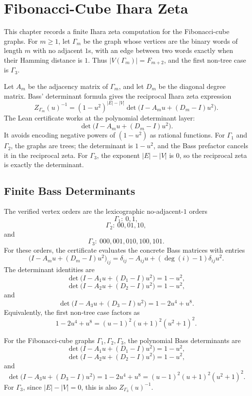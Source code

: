 \chapter{Fibonacci-Cube Ihara Zeta}
\label{ch:concrete-instances-fibonacci-cube-ihara-zeta}

This chapter records a finite Ihara zeta computation for the Fibonacci-cube graphs. For $m\ge 1$, let $\Gamma_m$ be the graph whose vertices are the binary words of length $m$ with no adjacent $1$s, with an edge between two words exactly when their Hamming distance is $1$. Thus $|V(\Gamma_m)|=F_{m+2}$, and the first non-tree case is $\Gamma_3$.

Let $A_m$ be the adjacency matrix of $\Gamma_m$, and let $D_m$ be the diagonal degree matrix. Bass' determinant formula gives the reciprocal Ihara zeta expression
$$
Z_{\Gamma_m}(u)^{-1}
=(1-u^2)^{|E|-|V|}
\det\!\bigl(I-A_mu+(D_m-I)u^2\bigr).
$$
The Lean certificate works at the polynomial determinant layer:
$$
\det\!\bigl(I-A_mu+(D_m-I)u^2\bigr).
$$
It avoids encoding negative powers of $(1-u^2)$ as rational functions. For $\Gamma_1$ and $\Gamma_2$, the graphs are trees; the determinant is $1-u^2$, and the Bass prefactor cancels it in the reciprocal zeta. For $\Gamma_3$, the exponent $|E|-|V|$ is $0$, so the reciprocal zeta is exactly the determinant.

\section{Finite Bass Determinants}
\label{sec:fibonacci-cube-ihara-finite-bass-determinants}

The verified vertex orders are the lexicographic no-adjacent-$1$ orders
$$
\Gamma_1:\ 0,1,
$$
$$
\Gamma_2:\ 00,01,10,
$$
and
$$
\Gamma_3:\ 000,001,010,100,101.
$$
For these orders, the certificate evaluates the concrete Bass matrices with entries
$$
\bigl(I-A_mu+(D_m-I)u^2\bigr)_{ij}
=\delta_{ij}-A_{ij}u+(\deg(i)-1)\delta_{ij}u^2.
$$
The determinant identities are
$$
\det\!\bigl(I-A_1u+(D_1-I)u^2\bigr)=1-u^2,
$$
$$
\det\!\bigl(I-A_2u+(D_2-I)u^2\bigr)=1-u^2,
$$
and
$$
\det\!\bigl(I-A_3u+(D_3-I)u^2\bigr)=1-2u^4+u^8.
$$
Equivalently, the first non-tree case factors as
$$
1-2u^4+u^8=(u-1)^2(u+1)^2(u^2+1)^2.
$$

\begin{theorem}
\label{thm:fibonacci-cube-ihara-zeta-certificate}
For the Fibonacci-cube graphs $\Gamma_1,\Gamma_2,\Gamma_3$, the polynomial Bass determinants are
$$
\det\!\bigl(I-A_1u+(D_1-I)u^2\bigr)=1-u^2,
$$
$$
\det\!\bigl(I-A_2u+(D_2-I)u^2\bigr)=1-u^2,
$$
and
$$
\det\!\bigl(I-A_3u+(D_3-I)u^2\bigr)=1-2u^4+u^8=(u-1)^2(u+1)^2(u^2+1)^2.
$$
For $\Gamma_3$, since $|E|-|V|=0$, this is also $Z_{\Gamma_3}(u)^{-1}$.
\end{theorem}

